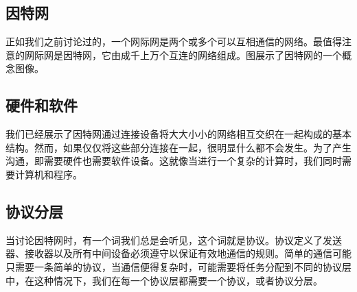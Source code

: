 \subsection{因特网}
正如我们之前讨论过的，一个网际网是两个或多个可以互相通信的网络。最值得注意的网际网是因特网，它由成千上万个互连的网络组成。图展示了因特网的一个概念图像。
\subsection{硬件和软件}

我们已经展示了因特网通过连接设备将大大小小的网络相互交织在一起构成的基本结构。然而，如果仅仅将这些部分连接在一起，很明显什么都不会发生。为了产生沟通，即需要硬件也需要软件设备。这就像当进行一个复杂的计算时，我们同时需要计算机和程序。

\subsection{协议分层}

当讨论因特网时，有一个词我们总是会听见，这个词就是协议。协议定义了发送器、接收器以及所有中间设备必须遵守以保证有效地通信的规则。简单的通信可能只需要一条简单的协议，当通信便得复杂时，可能需要将任务分配到不同的协议层中，在这种情况下，我们在每一个协议层都需要一个协议，或者协议分层。

